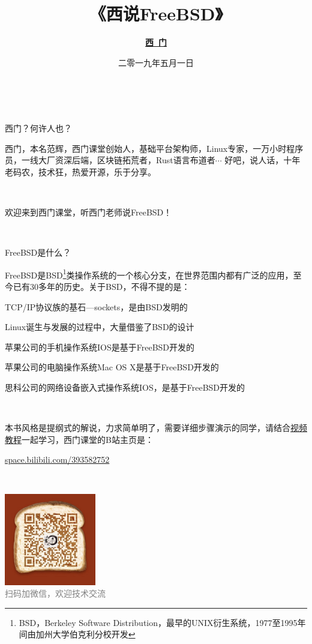


\title{\huge\textbf{《西说FreeBSD》}}
\author{\href{https://github.com/XiMen-classroom}{\LARGE \textbf{西~门}}}
\date{二零一九年五月一日}



\thispagestyle{empty}
\maketitle

~\par
西门？何许人也？

西门，本名范辉，西门课堂创始人，基础平台架构师，Linux专家，一万小时程序员，一线大厂资深后端，区块链拓荒者，Rust语言布道者$\cdots$%
好吧，说人话，十年老码农，技术狂，热爱开源，乐于分享。

~\par
欢迎来到西门课堂，听西门老师说FreeBSD！

~\par
FreeBSD是什么？

FreeBSD是BSD\footnote{BSD，Berkeley Software Distribution，最早的UNIX衍生系统，1977至1995年间由加州大学伯克利分校开发}类操作系统的一个核心分支，在世界范围内都有广泛的应用，至今已有30多年的历史。关于BSD，不得不提的是：
\begin{ITEMIZE}
    \item TCP/IP协议族的基石---sockets\footnotemark，是由BSD发明的
    \item Linux诞生与发展的过程中，大量借鉴了BSD的设计
    \item 苹果公司的手机操作系统IOS是基于FreeBSD开发的
    \item 苹果公司的电脑操作系统Mac OS X是基于FreeBSD开发的
    \item 思科公司的网络设备嵌入式操作系统IOS，是基于FreeBSD开发的
\end{ITEMIZE}

~\par
本书风格是提纲式的解说，力求简单明了，需要详细步骤演示的同学，请结合\href{https://space.bilibili.com/393582752}{视频教程}一起学习，西门课堂的B站主页是：

\href{https://space.bilibili.com/393582752}{space.bilibili.com/393582752}

~\par
\begin{center}
    \includegraphics[width=0.3\textwidth]{figs/WeChat.jpg}\\
    \textcolor{gray}{扫码加微信，欢迎技术交流}
\end{center}

